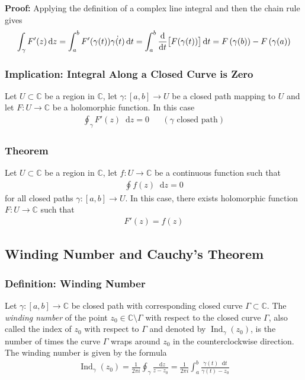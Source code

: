 \documentclass[11pt, a4paper]{article}
\newcommand{\diff}{\mathop{}\!\mathrm{d}} %
\newcommand{\C}{\mathbb{C}} %
\begin{document}
\textbf{Proof: } Applying the definition of a complex line integral and then the chain rule gives
\begin{align*}
	\int_{\gamma} F'(z) \diff z = \int_{a}^{b} F'(\gamma(t)) \dot{\gamma(t)} \diff t = \int_{a}^{b}\dv{}{t} \big[F(\gamma(t))\big] \diff t = F\left(\gamma(b)\right) - F\left(\gamma(a)\right)
\end{align*}


\subsubsection{Implication: Integral Along a Closed Curve is Zero}
Let $ U \subset \C $ be a region in $ \C $, let $ \gamma : [a, b] \to U $ be a closed path mapping to $ U $ and let $ F:U \to \C $ be a holomorphic function. In this case
\begin{align*}
	\oint_{\gamma} F'(z) \diff z = 0 && (\gamma \text{ closed path})
\end{align*}

\subsubsection{Theorem}
Let $ U \subset \C $ be a region in $ \C $, let $ f: U \to \C $ be a continuous function such that
\begin{align*}
	\oint f(z) \diff z = 0
\end{align*}
for all closed paths $ \gamma : [a, b] \to U $. In this case, there exists holomorphic function $ F: U \to \C $ such that 
\begin{align*}
	F'(z) = f(z)
\end{align*}

\subsection{Winding Number and Cauchy's Theorem}

\subsubsection{Definition: Winding Number}
Let $ \gamma : [a, b] \to \C $ be closed path with corresponding closed curve $ \Gamma \subset \C $. The \textit{winding number} of the point $ z_0 \in \C \setminus \Gamma $ with respect to the closed curve $ \Gamma $, also called the index of $ z_0 $ with respect to $ \Gamma $ and denoted by $ \operatorname{Ind}_{\gamma}(z_0) $, is the number of times the curve $ \Gamma $ wraps around $ z_0 $ in the counterclockwise direction. The winding number is given by the formula
\begin{align*}
	\operatorname{Ind}_{\gamma}(z_0) = \frac{1}{2\pi i} \oint_{\gamma} \frac{\diff z}{z - z_0} = \frac{1}{2\pi i} \int_{a}^{b} \frac{\dot{\gamma}(t) \diff t}{\gamma(t) - z_0} 
\end{align*}
\end{document}
